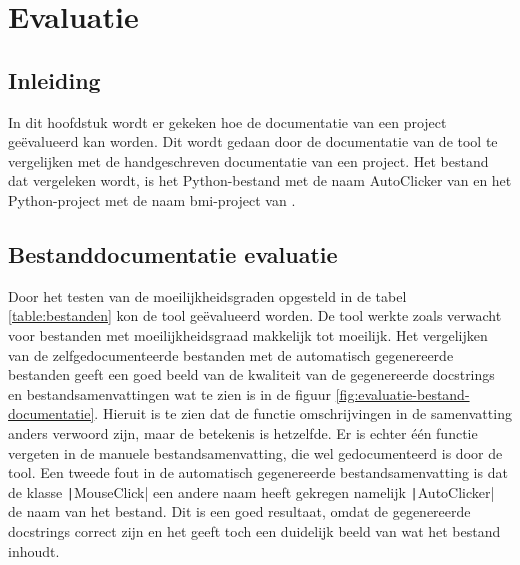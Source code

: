 \section{Evaluatie}
\label{sec:project-documentatie-evaluatie}

\subsection{Inleiding}
\label{sec:project-documentatie-evaluatie-inleiding}

In dit hoofdstuk wordt er gekeken hoe de documentatie van een project geëvalueerd kan worden.
Dit wordt gedaan door de documentatie van de tool te vergelijken met de handgeschreven documentatie van een project.
Het bestand dat vergeleken wordt, is het Python-bestand met de naam AutoClicker van \textcite{Waegeneer2022} en het Python-project met de naam bmi-project van \textcite{Simmons2019}.

\subsection{Bestanddocumentatie evaluatie}
\label{sec:project-documentatie-evaluatie-bestand}

Door het testen van de moeilijkheidsgraden opgesteld in de tabel \ref{table:bestanden} kon de tool geëvalueerd worden.
De tool werkte zoals verwacht voor bestanden met moeilijkheidsgraad makkelijk tot moeilijk.
Het vergelijken van de zelfgedocumenteerde bestanden met de automatisch gegenereerde bestanden geeft een goed beeld van de kwaliteit van de gegenereerde docstrings en bestandsamenvattingen wat te zien is in de figuur \ref{fig:evaluatie-bestand-documentatie}.
Hieruit is te zien dat de functie omschrijvingen in de samenvatting anders verwoord zijn, maar de betekenis is hetzelfde.
Er is echter één functie vergeten in de manuele bestandsamenvatting, die wel gedocumenteerd is door de tool.
Een tweede fout in de automatisch gegenereerde bestandsamenvatting is dat de klasse \texttt|MouseClick| een andere naam heeft gekregen namelijk \texttt|AutoClicker| de naam van het bestand.
Dit is een goed resultaat, omdat de gegenereerde docstrings correct zijn en het geeft toch een duidelijk beeld van wat het bestand inhoudt.

